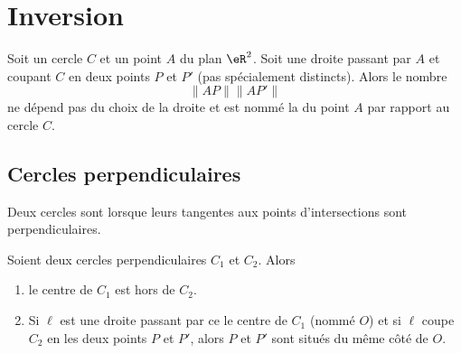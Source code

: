 
\section{Inversion}

\begin{lemmaDef}        \label{LEMooNLYKooKBMdDk}
    Soit un cercle \( C\) et un point \( A\) du plan \( \eR^2\). Soit une droite passant par \( A\) et coupant \( C\) en deux points \( P\) et \( P'\) (pas spécialement distincts). Alors le nombre 
    \begin{equation}
        \| AP \|\| AP' \|
    \end{equation}
    ne dépend pas du choix de la droite et est nommé la  du point \( A\) par rapport au cercle \( C\).
\end{lemmaDef}

\subsection{Cercles perpendiculaires}

\begin{definition}
    Deux cercles sont  lorsque leurs tangentes aux points d'intersections sont perpendiculaires.
\end{definition}

\begin{lemma}        \label{LEMooWMGOooAieUjD}
    Soient deux cercles perpendiculaires \( C_1\) et \( C_2\). Alors
    \begin{enumerate}
        \item       \label{ITEMooJVYYooSrlSdA}
            le centre de \( C_1\) est hors de \( C_2\).
        \item        \label{ITEMooTQATooNWvllF}
            Si \( \ell\) est une droite passant par ce le centre de \( C_1\) (nommé \( O\)) et si \( \ell\) coupe \( C_2\) en les deux points \( P\) et \( P'\), alors \( P\) et \( P'\) sont situés du même côté de \( O\).
    \end{enumerate}
\end{lemma}

